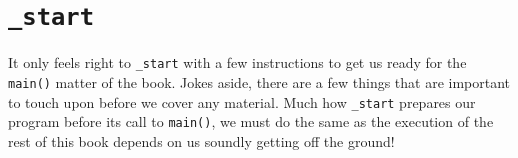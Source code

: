 %

\chapter{\texttt{\_start}}

It only feels right to \texttt{_start} with a few instructions to
get us ready for the \texttt{main()} matter of the book.  Jokes
aside, there are a few things that are important to touch upon before we
cover any material.  Much how \texttt{_start} prepares our
program before its call to \texttt{main()}, we must do the same
as the execution of the rest of this book depends on us soundly getting
off the ground!
